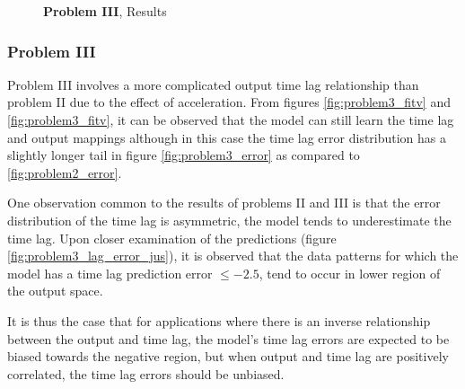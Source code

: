 \documentclass[envcountsect,runningheads]{llncs}
\theoremstyle{etoile}
\begin{document}
\begin{figure}
  \caption{\textbf{Problem III}, Results}
\end{figure}


\subsubsection{Problem III}

Problem III involves a more complicated output time lag relationship than problem II due to the 
effect of acceleration. From figures \ref{fig:problem3_fitv} and \ref{fig:problem3_fitv}, 
it can be observed that the model can still learn the time lag and output mappings although 
in this case the time lag error distribution has a slightly longer tail in figure 
\ref{fig:problem3_error} as compared to \ref{fig:problem2_error}.

One observation common to the results of problems II and III is that the error distribution of 
the time lag is asymmetric, the model tends to underestimate the time lag. Upon closer examination 
of the predictions (figure \ref{fig:problem3_lag_error_jus}), it is observed that the data patterns 
for which the model has a time lag prediction error $\leq -2.5$, tend to occur in lower region of 
the output space. %

It is thus the case that for applications where there is an inverse relationship between the output 
and time lag, the model's time lag errors are expected to be biased towards the negative region, 
but when output and time lag are positively correlated, the time lag errors should be unbiased.


\end{document}
